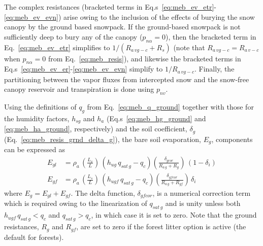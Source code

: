%
The complex resistances (bracketed terms in 
Eq.s~\ref{eq:meb_ev_etr}-\ref{eq:meb_ev_evn}) 
arise owing to the
inclusion of the effects of burying the snow canopy by the ground
based snowpack. If the ground-based snowpack is not sufficiently deep
to bury any of the canopy ($p_{n\alpha}=0$),
then the bracketed term in Eq.~\ref{eq:meb_ev_etr} simplifies 
to $1/\left(R_{a\,vg-c} + R_s\right)$
(note that $R_{a\,vg-c}=R_{a\,v-c}$ when $p_{n\alpha}=0$ from
Eq.~\ref{eq:meb_resis}),
and likewise
the bracketed terms in Eq.s~\ref{eq:meb_ev_er}-\ref{eq:meb_ev_evn} 
simplify to $1/R_{a\,vg-c}$.
%
Finally, the partitioning between the vapor fluxes from intercepted
snow and the snow-free canopy reservoir and transpiration is done
using $p_{nv}$.



Using the definitions of $q_g$ from Eq.~\ref{eq:meb_q_ground}
together with those for the humidity factors, $h_{sg}$ and $h_a$
(Eq.s~\ref{eq:meb_hg_ground} and \ref{eq:meb_ha_ground}, respectively) and
the soil coefficient, $\delta_g$ (Eq.~\ref{eq:meb_resis_grnd_delta_g}),
the bare soil evaporation, $E_g$, components can be 
expressed as
%
\begin{align}
\label{eq:meb_eg_l}
%
E_{gl} &= \rho_a \, \left({\frac{L_v}{L}}\right) \,
\left(  h_{ug}\,q_{sat\,g} - q_c \right)
\left({\frac{\delta_{gcor}}{R_{a\,g} + R_g}}\right)
\, \left(1-\delta_i\right)
\\
\label{eq:meb_eg_f}
%
E_{gf} &= \rho_a \, \left({\frac{L_s}{L}}\right) \,
\left(  h_{ugf}\,q_{sat\,g} - q_c \right)
\left({\frac{\delta_{gfcor}}{R_{a\,g} + R_{gf}}}\right)
\, \delta_i
%
\end{align}
%
where $E_g = E_{gl} + E_{gf}$.
The delta function, $\delta_{gfcor}$, 
is a numerical correction term 
which is
required owing to the linearization of $q_{sat\,g}$
and is unity unless both $ h_{ugf}\, q_{sat\,g}< q_c$ and
$q_{sat\,g} > q_c$, in which case it is set to zero. 
%
Note that the ground resistances, $R_g$ and $R_{gf}$, are set to zero if the
forest litter option is active (the default for forests). 
%


